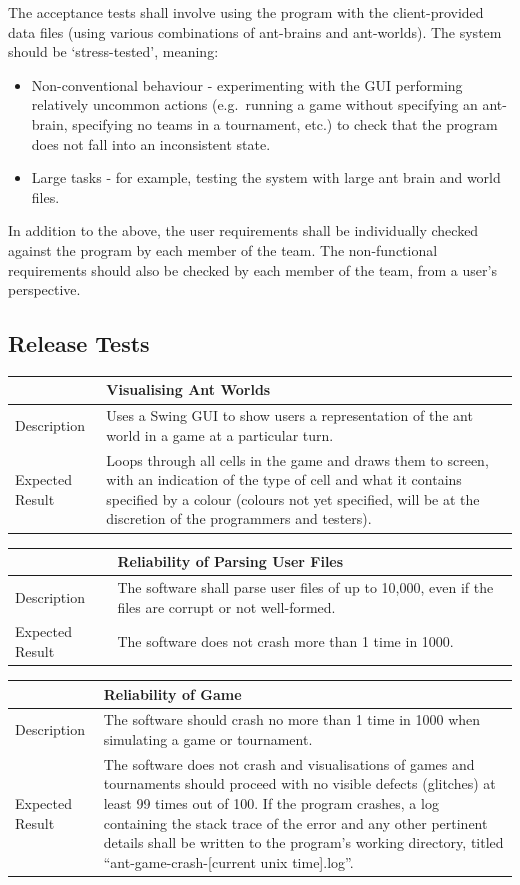 \documentclass[11pt]{article}
\begin{document}
The acceptance tests shall involve using the program with the
client-provided data files (using various combinations of ant-brains and
ant-worlds). The system should be `stress-tested', meaning: 
\begin{itemize}
\item Non-conventional behaviour - experimenting with the GUI performing
relatively uncommon actions (e.g.~running a game without specifying an
ant-brain, specifying no teams in a tournament, etc.) to check that the
program does not fall into an inconsistent state.
\item Large tasks - for
example, testing the system with large ant brain and world files.
\end{itemize}
In addition to the above, the user requirements shall be individually
checked against the program by each member of the team. The
non-functional requirements should also be checked by each member of the
team, from a user's perspective.

\subsection{Release Tests}\label{gui}

\begin{longtable}[c]{@{}p{}p{}@{}}
\toprule
& Visualising Ant Worlds \tabularnewline
\midrule
Description & Uses a Swing GUI to show users a representation of the
ant world in a game at a particular turn.\tabularnewline
Expected Result & Loops through all cells in the game and draws them to
screen, with an indication of the type of cell and what it contains
specified by a colour (colours not yet specified, will be at the
discretion of the programmers and testers).\tabularnewline
\bottomrule
\end{longtable}

\begin{longtable}[c]{@{}p{}p{}@{}}
\toprule
& Reliability of Parsing User Files \tabularnewline
\midrule
Description & The software shall parse user files of up to 10,000,
even if the files are corrupt or not well-formed.\tabularnewline
Expected Result & The software does not crash more than 1 time in 1000. \tabularnewline
\bottomrule
\end{longtable}

\begin{longtable}[c]{@{}p{}p{}@{}}
\toprule
& Reliability of Game \tabularnewline
\midrule
Description & The software should crash no more than 1 time in 1000
when simulating a game or tournament.\tabularnewline
Expected Result & The software does not crash and visualisations of games
and tournaments should proceed with no visible defects (glitches) at
least 99 times out of 100. If the program crashes, a log containing the
stack trace of the error and any other pertinent details shall be
written to the program's working directory, titled
``ant-game-crash-{[}current unix time{]}.log''. \tabularnewline
\bottomrule
\end{longtable}
\end{document}
